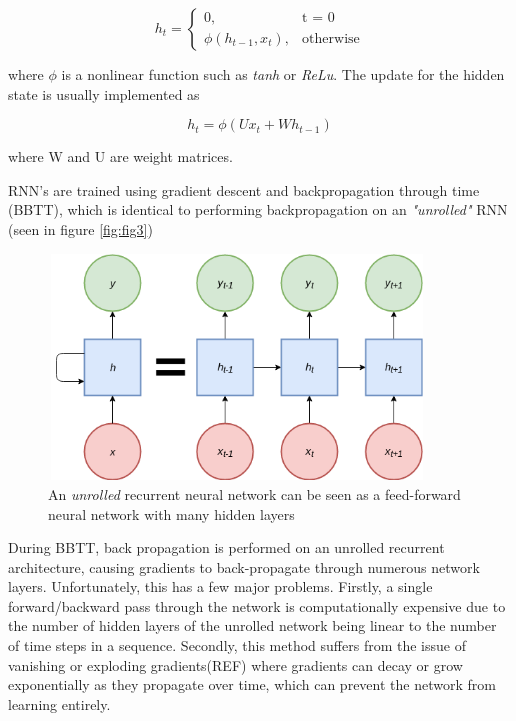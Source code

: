 \begin{equation}
	h_{t}=
	\begin{cases}
	 0, & \text{t = 0} \\
	 \phi{(h_{t-1}, x_{t})}, & \text{otherwise}
	\end{cases}
\end{equation}

\noindent
where $\phi$ is a nonlinear function such as \textit{tanh} or \textit{ReLu}. The update for the hidden state is usually implemented as 

\begin{equation}
h_{t} = \phi{(Ux_{t} + Wh_{t-1})}
\end{equation}

\noindent
where W and U are weight matrices.

\par
\noindent
\newline
RNN's are trained using gradient descent and backpropagation through time (BBTT), which is identical to performing backpropagation on an \textit{"unrolled"} RNN (seen in figure \autoref{fig:fig3})

\begin{figure}[h]
	\includegraphics[width=10cm, height=6cm]{./figures/fig3}
	\centering
	\caption{An \textit{unrolled} recurrent neural network can be seen as a feed-forward neural network with many hidden layers}
	\label{fig:fig3}
\end{figure}

\par
\noindent
\newline
During BBTT, back propagation is performed on an unrolled recurrent architecture, causing gradients to back-propagate through numerous network layers. Unfortunately, this has a few major problems. Firstly, a single forward/backward pass through the network is computationally expensive due to the number of hidden layers of the unrolled network being linear to the number of time steps in a sequence. Secondly, this method suffers from the issue of vanishing or exploding gradients(REF) where gradients can decay or grow exponentially as they propagate over time, which can prevent the network from learning entirely.

